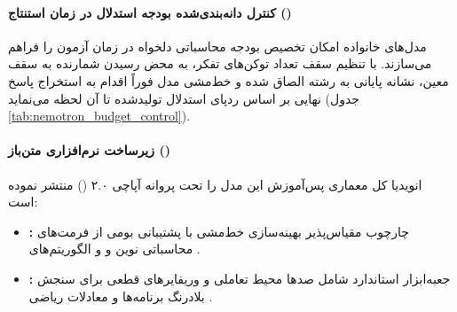 \paragraph*{کنترل دانه‌بندی‌شده بودجه استدلال در زمان استنتاج ()}
مدل‌های خانواده  امکان تخصیص بودجه محاسباتی دلخواه در زمان آزمون را فراهم می‌سازند. با تنظیم سقف تعداد توکن‌های تفکر، به محض رسیدن شمارنده به سقف معین، نشانه پایانی  به رشته الصاق شده و خط‌مشی مدل فوراً اقدام به استخراج پاسخ نهایی بر اساس ردپای استدلال تولیدشده تا آن لحظه می‌نماید (جدول \ref{tab:nemotron_budget_control}).

\begin{table}[htbp]
\centering
\caption{تحلیل اثر بودجه توکن تفکر بر دقت وظایف استدلالی در مدل }
\label{tab:nemotron_budget_control}
\end{table}

\paragraph*{زیرساخت نرم‌افزاری متن‌باز ()}
انویدیا کل معماری پس‌آموزش این مدل را تحت پروانه آپاچی ۲.۰ () منتشر نموده است:
\begin{itemize}
    \item \textbf{:} چارچوب مقیاس‌پذیر بهینه‌سازی خط‌مشی با پشتیبانی بومی از فرمت‌های محاسباتی نوین  و  و الگوریتم‌های  \cite{nemotron3_2025}.
    \item \textbf{:} جعبه‌ابزار استاندارد شامل صدها محیط تعاملی و وریفایرهای قطعی برای سنجش بلادرنگ برنامه‌ها و معادلات ریاضی \cite{nemotron3_2025}.
\end{itemize}